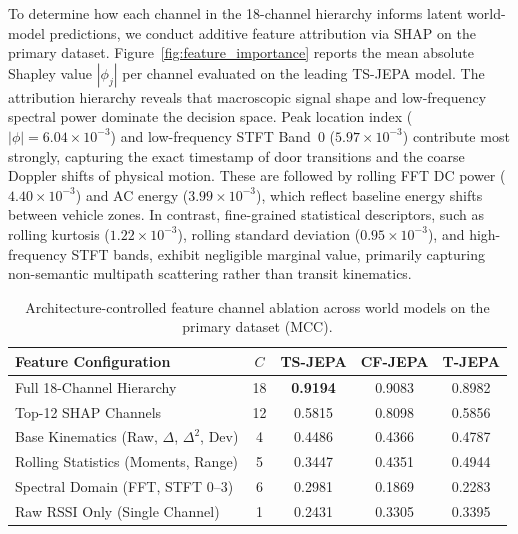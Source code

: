 To determine how each channel in the 18-channel hierarchy informs latent world-model predictions, we conduct additive feature attribution via \ac{SHAP} on the primary dataset. Figure~\ref{fig:feature_importance} reports the mean absolute Shapley value $|\phi_j|$ per channel evaluated on the leading \ac{TS-JEPA} model. The attribution hierarchy reveals that macroscopic signal shape and low-frequency spectral power dominate the decision space. Peak location index ($|\phi| = 6.04 \times 10^{-3}$) and low-frequency STFT Band~0 ($5.97 \times 10^{-3}$) contribute most strongly, capturing the exact timestamp of door transitions and the coarse Doppler shifts of physical motion. These are followed by rolling FFT DC power ($4.40 \times 10^{-3}$) and AC energy ($3.99 \times 10^{-3}$), which reflect baseline energy shifts between vehicle zones. In contrast, fine-grained statistical descriptors, such as rolling kurtosis ($1.22 \times 10^{-3}$), rolling standard deviation ($0.95 \times 10^{-3}$), and high-frequency STFT bands, exhibit negligible marginal value, primarily capturing non-semantic multipath scattering rather than transit kinematics.

\begin{table}[t]
    \caption{Architecture-controlled feature channel ablation across world models on the primary dataset (\ac{MCC}).}
    \label{tab:pruning}
    \centering
    \scriptsize
    \setlength{\tabcolsep}{2.5pt}
    \begin{tabular}{lcccc}
        \toprule
        Feature Configuration                            & $C$ & \ac{TS-JEPA}    & CF-JEPA & T-JEPA \\
        \midrule
        Full 18-Channel Hierarchy                        & 18  & \textbf{0.9194} & 0.9083  & 0.8982 \\
        Top-12 \ac{SHAP} Channels                        & 12  & 0.5815          & 0.8098  & 0.5856 \\
        Base Kinematics (Raw, $\Delta$, $\Delta^2$, Dev) & 4   & 0.4486          & 0.4366  & 0.4787 \\
        Rolling Statistics (Moments, Range)              & 5   & 0.3447          & 0.4351  & 0.4944 \\
        Spectral Domain (FFT, STFT 0--3)                 & 6   & 0.2981          & 0.1869  & 0.2283 \\
        Raw \ac{RSSI} Only (Single Channel)              & 1   & 0.2431          & 0.3305  & 0.3395 \\
        \bottomrule
    \end{tabular}
\end{table}

